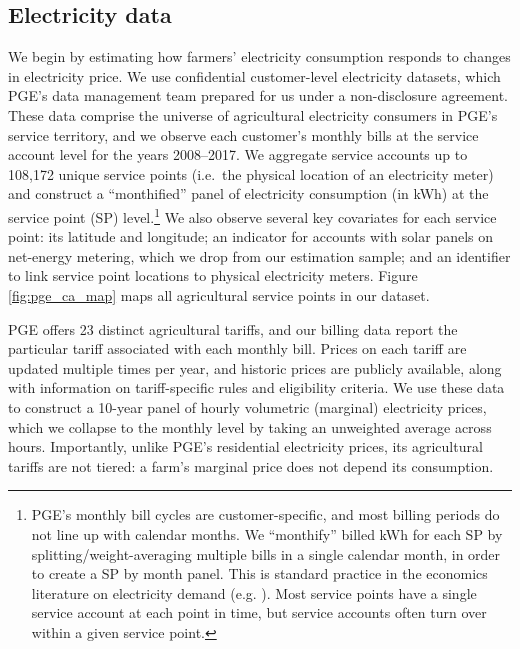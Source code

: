 %
%

\subsection{Electricity data}

We begin by estimating how farmers' electricity consumption responds to changes in electricity price. We use confidential customer-level electricity datasets, which PGE's data management team prepared for us under a non-disclosure agreement. These data comprise the universe of agricultural electricity consumers in PGE's service territory, and we observe each customer's monthly bills at the service account level for the years 2008--2017. We aggregate service accounts up to 108,172 unique service points (i.e.\ the physical location of an electricity meter) and construct a ``monthified'' panel of electricity consumption (in kWh) at the service point (SP) level.\footnote{
PGE's monthly bill cycles are customer-specific, and most billing periods do not line up with calendar months. We ``monthify'' billed kWh for each SP by splitting/weight-averaging multiple bills in a single calendar month, in order to create a SP by month panel. This is standard practice in the economics literature on electricity demand (e.g. \textcite{ito2014}). Most service points have a single service account at each point in time, but service accounts often turn over within a given service point.
}
We also observe several key covariates for each service point: its latitude and longitude; an indicator for accounts with solar panels on net-energy metering, which we drop from our estimation sample; and an identifier to link service point locations to physical electricity meters. Figure \ref{fig:pge_ca_map} maps all agricultural service points in our dataset.

PGE offers 23 distinct agricultural tariffs, and our billing data report the particular tariff associated with each monthly bill. Prices on each tariff are updated multiple times per year, and historic prices are publicly available, along with information on tariff-specific rules and eligibility criteria. We use these data to construct a 10-year panel of hourly volumetric (marginal) electricity prices, which we collapse to the monthly level by taking an unweighted average across hours.
Importantly, unlike PGE's residential electricity prices, its agricultural tariffs are not tiered: a farm's marginal price does not depend its consumption. 

